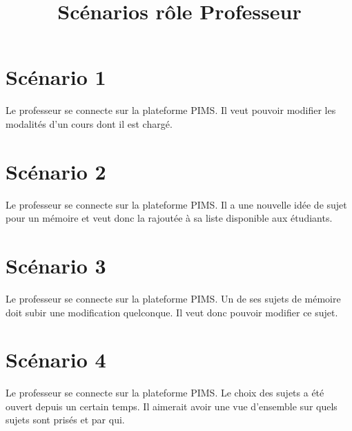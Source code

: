\documentclass[a4paper, 11pt]{article}
\title{Scénarios rôle \bf Professeur}
\author{}
\begin{document}
\maketitle

\section*{Scénario 1}
Le professeur se connecte sur la plateforme PIMS. Il veut pouvoir modifier les modalités d'un cours dont il est chargé.

\section*{Scénario 2}
Le professeur se connecte sur la plateforme PIMS. Il a une nouvelle idée de sujet pour un mémoire et veut donc la rajoutée à sa liste disponible aux étudiants.

\section*{Scénario 3}
Le professeur se connecte sur la plateforme PIMS. Un de ses sujets de mémoire doit subir une modification quelconque. Il veut donc pouvoir modifier ce sujet.

\section*{Scénario 4}
Le professeur se connecte sur la plateforme PIMS. Le choix des sujets a été ouvert depuis un certain temps. Il aimerait avoir une vue d'ensemble sur quels sujets sont prisés et par qui.
\end{document}

